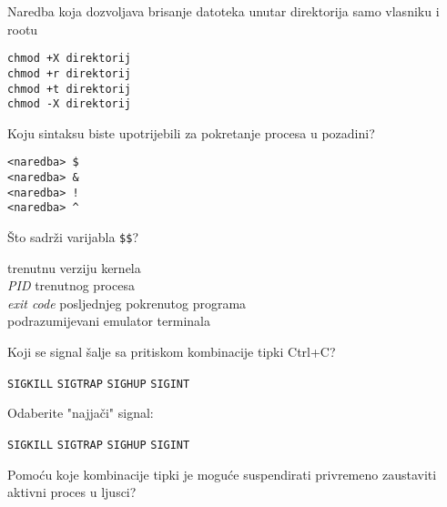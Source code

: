 \documentclass[a4paper,11pt]{exam}
\newcommand{\shell}[1]{\texttt{#1}}
\begin{document}
\begin{questions}
	\question
	Naredba koja dozvoljava brisanje datoteka unutar direktorija samo vlasniku i rootu 
	
	\begin{oneparchoices}
		\choice \shell{chmod +X direktorij} \\
		\choice \shell{chmod +r direktorij} \\
    	\choice \shell{chmod +t direktorij}\\ 	
	  \choice \shell{chmod -X direktorij}
	\end{oneparchoices}

	\question
	Koju sintaksu biste upotrijebili za pokretanje procesa u pozadini?

	\begin{oneparchoices}
		\choice \shell{<naredba> \$} \\
		\choice \shell{<naredba> \&} \\
		\choice \shell{<naredba> !} \\
		\choice \shell{<naredba> \textasciicircum} \\
	\end{oneparchoices}
	
	\question
  Što sadrži varijabla \shell{\$\$}?

	\begin{oneparchoices}
				\choice trenutnu verziju kernela\\
		\choice \textit{PID} trenutnog procesa \\ 
		\choice \textit{exit code} posljednjeg pokrenutog programa\\
		\choice podrazumijevani emulator terminala
	\end{oneparchoices}
	
	\question
  Koji se signal šalje sa pritiskom kombinacije tipki Ctrl+C? 

  \begin{oneparchoices}
		\choice \shell{SIGKILL}
		\choice \shell{SIGTRAP}
    \choice \shell{SIGHUP}
    \choice \shell{SIGINT}  
  \end{oneparchoices}

	\question
  Odaberite "najjači" signal:

  \begin{oneparchoices}
		\choice \shell{SIGKILL}
		\choice \shell{SIGTRAP}
    \choice \shell{SIGHUP}
    \choice \shell{SIGINT}  
  \end{oneparchoices}


	\question
Pomoću koje kombinacije tipki je moguće suspendirati privremeno zaustaviti aktivni proces u ljusci?


\end{questions}
\end{document}
